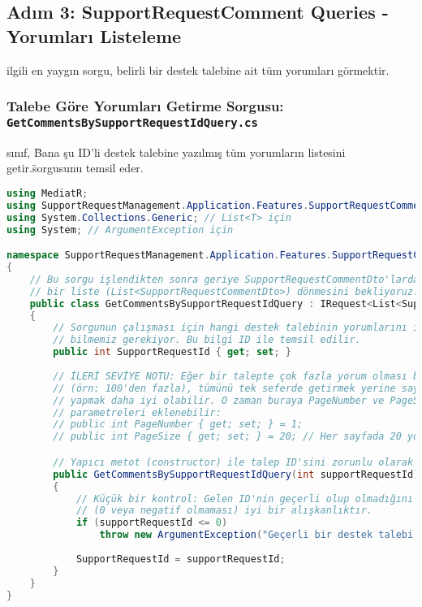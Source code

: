 \documentclass[11pt, a4paper]{article}
\begin{document}
\subsection{Adım 3: SupportRequestComment Queries - Yorumları Listeleme}
\nYorumlarla ilgili en yaygın sorgu, belirli bir destek talebine ait tüm yorumları görmektir.

\subsubsection{Talebe Göre Yorumları Getirme Sorgusu: \texttt{GetCommentsBySupportRequestIdQuery.cs}}
\nBu sınıf, \"Bana şu ID'li destek talebine yazılmış tüm yorumların listesini getir.\" sorgusunu temsil eder.

\begin{lstlisting}[language=C#]
using MediatR;
using SupportRequestManagement.Application.Features.SupportRequestComment.Dtos; // Liste dönecek
using System.Collections.Generic; // List<T> için
using System; // ArgumentException için

namespace SupportRequestManagement.Application.Features.SupportRequestComment.Queries
{
    // Bu sorgu işlendikten sonra geriye SupportRequestCommentDto'lardan oluşan
    // bir liste (List<SupportRequestCommentDto>) dönmesini bekliyoruz.
    public class GetCommentsBySupportRequestIdQuery : IRequest<List<SupportRequestCommentDto>>
    {
        // Sorgunun çalışması için hangi destek talebinin yorumlarını istediğimizi
        // bilmemiz gerekiyor. Bu bilgi ID ile temsil edilir.
        public int SupportRequestId { get; set; }
        
        // İLERİ SEVİYE NOTU: Eğer bir talepte çok fazla yorum olması bekleniyorsa
        // (örn: 100'den fazla), tümünü tek seferde getirmek yerine sayfalama
        // yapmak daha iyi olabilir. O zaman buraya PageNumber ve PageSize
        // parametreleri eklenebilir:
        // public int PageNumber { get; set; } = 1;
        // public int PageSize { get; set; } = 20; // Her sayfada 20 yorum

        // Yapıcı metot (constructor) ile talep ID'sini zorunlu olarak alıyoruz.
        public GetCommentsBySupportRequestIdQuery(int supportRequestId)
        {
            // Küçük bir kontrol: Gelen ID'nin geçerli olup olmadığını kontrol etmek
            // (0 veya negatif olmaması) iyi bir alışkanlıktır.
            if (supportRequestId <= 0) 
                throw new ArgumentException("Geçerli bir destek talebi ID'si gereklidir.", nameof(supportRequestId));
                
            SupportRequestId = supportRequestId;
        }
    }
}
\end{lstlisting}
\end{document}
